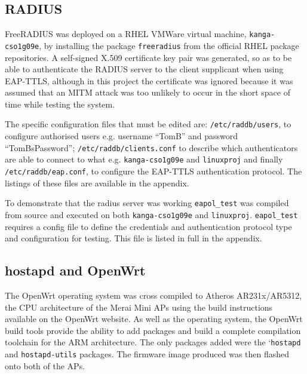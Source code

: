 \documentclass[pdftex, 12pt, a4paper]{article}
\begin{document}
\subsection{RADIUS}
FreeRADIUS was deployed on a RHEL VMWare virtual machine, \verb`kanga-cso1g09e`, by installing the package \verb`freeradius` from the official RHEL package repositories.  A self-signed X.509 certificate key pair was generated, so as to be able to authenticate the RADIUS server to the client supplicant when using EAP-TTLS, although in this project the certificate was ignored because it was assumed that an MITM attack was too unlikely to occur in the short space of time while testing the system.


The specific configuration files that must be edited are: \verb`/etc/raddb/users`, to configure authorised users e.g. username ``TomB'' and password ``TomBsPassword''; \verb`/etc/raddb/clients.conf` to describe which authenticators are able to connect to what e.g. \verb`kanga-cso1g09e` and \verb`linuxproj` and finally \verb`/etc/raddb/eap.conf`, to configure the EAP-TTLS authentication protocol.  The listings of these files are available in the appendix.

To demonstrate that the radius server was working \verb`eapol_test` was compiled from source and executed on both \verb`kanga-cso1g09e` and \verb`linuxproj`.  \verb`eapol_test` requires a config file to define the credentials and authentication protocol type and configuration for testing. This file is listed in full in the appendix.

\subsection{hostapd and OpenWrt}
The OpenWrt operating system was cross compiled to Atheros AR231x/AR5312, the CPU architecture of the Merai Mini APs using the build instructions available on the OpenWrt website\cite{openwrt-build}. As well as the operating system, the OpenWrt build tools provide the ability to add packages and build a complete compilation toolchain for the ARM architecture.  The only packages added were the `\verb`hostapd` and \verb`hostapd-utils` packages.  The firmware image produced was then flashed onto both of the APs.

\end{document}

